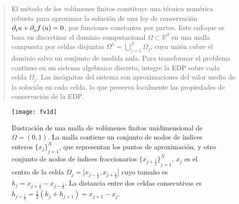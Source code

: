 \begin{frame}
	\begin{abstract}
		El método de los volúmenes finitos constituye una técnica
		numérica robusta para aproximar la solución de una ley de
		conservación $\difcp{u}{t}+\difcp{f\left(u\right)}{x}=0$, por
		funciones constantes por partes.
		Este enfoque se basa en discretizar el dominio computacional
		$\Omega\subset\mathbb{R}^{d}$ en una malla compuesta por celdas
		disjuntas
		\begin{math}
			\Omega^{h}=
			\bigcup_{j=1}^{N}
			\Omega_{j}
		\end{math},
		cuya unión cubre el dominio salvo un conjunto de medida nula.
		Para transformar el problema continuo en un sistema algebraico
		discreto, integre la EDP sobre cada celda $\Omega_{j}$.
		Las incógnitas del sistema son aproximaciones del valor medio de
		la solución en cada celda, lo que preserva localmente las
		propiedades de conservación de la EDP.
	\end{abstract}

	\begin{figure}[ht!]
		\centering
		\texttt{[image: fv1d]}
		\caption{Ilustración de una malla de volúmenes finitos
			unidimensional de $\Omega=\left(0,1\right)$.
			La malla contiene un conjunto de nodos de índices enteros
			\begin{math}
				{\big\{x_{j}\big\}}^{N}_{j=1}
			\end{math},
			que representan los puntos de aproximación, y otro conjunto de
			nodos de índices fraccionarios
			\begin{math}
				{\big\{x_{j+\tfrac{1}{2}}\big\}}^{N}_{j=1}
			\end{math}.
			\begin{math}
				x_{j}
			\end{math}
			es el centro de la celda
			\begin{math}
				\Omega_{j}=
				\big[
					x_{j-\tfrac{1}{2}},
					x_{j+\tfrac{1}{2}}
					\big]
			\end{math}
			cuyo tamaño es
			\begin{math}
				h_{j}=
				x_{j+\tfrac{1}{2}}-
				x_{j-\tfrac{1}{2}}
			\end{math}.
			La distancia entre dos celdas consecutivas es
			\begin{math}
				h_{j+\tfrac{1}{2}}=
				\frac{1}{2}\left(h_{j}+h_{j+1}\right)=
				x_{j+1}-x_{j}
			\end{math}.
		}
	\end{figure}
\end{frame}
